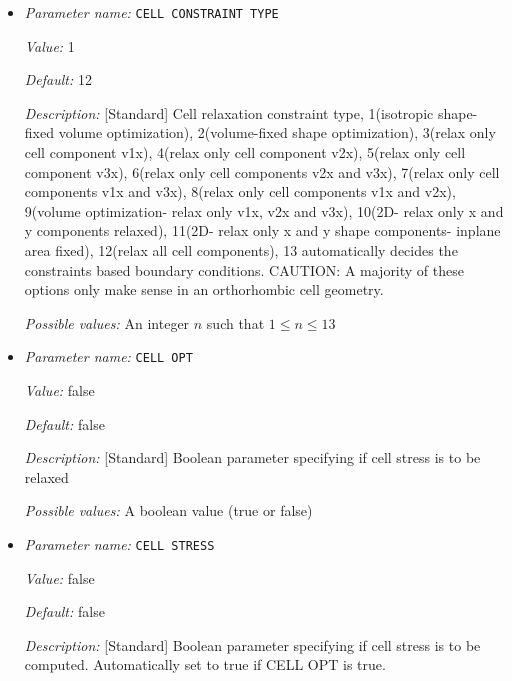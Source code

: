 \begin{itemize}
\item {\it Parameter name:} {\tt CELL CONSTRAINT TYPE}
\label{parameters:Geometry/Optimization/CELL CONSTRAINT TYPE}
\label{parameters:Geometry/Optimization/CELL_20CONSTRAINT_20TYPE}


{\it Value:} 1


{\it Default:} 12


{\it Description:} [Standard] Cell relaxation constraint type, 1(isotropic shape-fixed volume optimization), 2(volume-fixed shape optimization), 3(relax only cell component v1x), 4(relax only cell component v2x), 5(relax only cell component v3x), 6(relax only cell components v2x and v3x), 7(relax only cell components v1x and v3x), 8(relax only cell components v1x and v2x), 9(volume optimization- relax only v1x, v2x and v3x), 10(2D- relax only x and y components relaxed), 11(2D- relax only x and y shape components- inplane area fixed), 12(relax all cell components), 13 automatically decides the constraints based boundary conditions. CAUTION: A majority of these options only make sense in an orthorhombic cell geometry.


{\it Possible values:} An integer $n$ such that $1\leq n \leq 13$
\item {\it Parameter name:} {\tt CELL OPT}
\label{parameters:Geometry/Optimization/CELL OPT}
\label{parameters:Geometry/Optimization/CELL_20OPT}


{\it Value:} false


{\it Default:} false


{\it Description:} [Standard] Boolean parameter specifying if cell stress is to be relaxed


{\it Possible values:} A boolean value (true or false)
\item {\it Parameter name:} {\tt CELL STRESS}
\label{parameters:Geometry/Optimization/CELL STRESS}
\label{parameters:Geometry/Optimization/CELL_20STRESS}


{\it Value:} false


{\it Default:} false


{\it Description:} [Standard] Boolean parameter specifying if cell stress is to be computed. Automatically set to true if CELL OPT is true.



\end{itemize}
